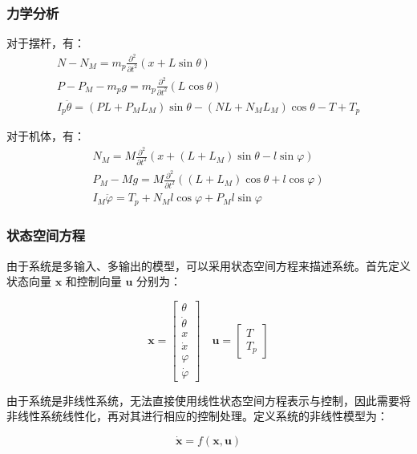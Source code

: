 \documentclass{beamer}
\begin{document}
	\begin{frame}
		\frametitle{力学分析}
		对于摆杆，有：
		\begin{gather*}
			N - N_M = m_p \frac{\partial^2}{\partial t^2}(x + L \sin\theta) \\
			P - P_M - m_p g = m_p \frac{\partial^2}{\partial t^2} (L \cos\theta) \\
			I_p \ddot{\theta} = (P L + P_M L_M) \sin\theta - (N L + N_M L_M) \cos\theta - T + T_p
		\end{gather*}
		
		对于机体，有：
		\begin{gather*}
			N_M = M \frac{\partial^2}{\partial t^2} \left(x + (L + L_M) \sin\theta - l \sin\varphi\right) \\
			P_M - M g = M \frac{\partial^2}{\partial t^2} \left((L + L_M) \cos\theta + l \cos\varphi\right) \\
			I_M \ddot{\varphi} = T_p + N_M l \cos\varphi + P_M l \sin\varphi
		\end{gather*}
	\end{frame}

	
	\begin{frame}
		\frametitle{状态空间方程}
		由于系统是多输入、多输出的模型，可以采用状态空间方程来描述系统。首先定义状态向量 $\mathbf{x}$ 和控制向量 $\mathbf{u}$ 分别为：
		
		\[
		\mathbf{x} = \begin{bmatrix}
			\theta \\
			\dot{\theta} \\
			x \\
			\dot{x} \\
			\varphi \\
			\dot{\varphi}
		\end{bmatrix}
		\quad
		\mathbf{u} = \begin{bmatrix}
			T \\
			T_p
		\end{bmatrix}
		\]
		
		由于系统是非线性系统，无法直接使用线性状态空间方程表示与控制，因此需要将非线性系统线性化，再对其进行相应的控制处理。定义系统的非线性模型为：
		
		\[
		\dot{\mathbf{x}} = f(\mathbf{x}, \mathbf{u}) \tag{3-4}
		\]
	\end{frame}
	
\end{document}
